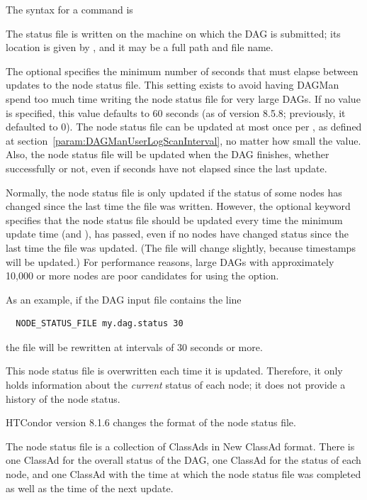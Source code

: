 The syntax for a  command is

  

The status file is written on the machine on which the DAG is submitted;
its location is given by ,
and it may be a full path and file name.

The optional  specifies the minimum number of seconds
that must elapse between updates to the node status file.
This setting exists to avoid having DAGMan spend too much time writing
the node status file for very large DAGs.
If no value is specified, this value defaults to 60 seconds (as
of version 8.5.8; previously, it defaulted to 0).
The node status file can be updated at most once
per ,
as defined at section~\ref{param:DAGManUserLogScanInterval},
no matter how small the  value.
Also, the node status file will be updated when the DAG finishes,
whether successfully or not, even if  seconds
have not elapsed since the last update.

Normally, the node status file is only updated if the status of
some nodes has changed since the last time the file was written.
However, the optional  keyword specifies that the
node status file should be updated every time the minimum update
time (and ),
has passed, even if no nodes have changed status since the last
time the file was updated.
(The file will change slightly,
because timestamps will be updated.)
For performance reasons,
large DAGs with approximately 10,000 or more nodes
are poor candidates for using the  option.

As an example, if the DAG input file contains the line
\begin{verbatim}
  NODE_STATUS_FILE my.dag.status 30
\end{verbatim}
the file  will be rewritten at intervals of 30 seconds
or more.

This node status file is overwritten each time it is updated.
Therefore, it only holds information about the \emph{current} status 
of each node; it does not provide a history of the node status.

\Note HTCondor version 8.1.6 changes the format of the node status
file.

The node status file is a collection of ClassAds in New ClassAd format.
There is one ClassAd for the overall status of the DAG, one ClassAd
for the status of each node, and one ClassAd with the time at which
the node status file was completed as well as the time of the next update.

